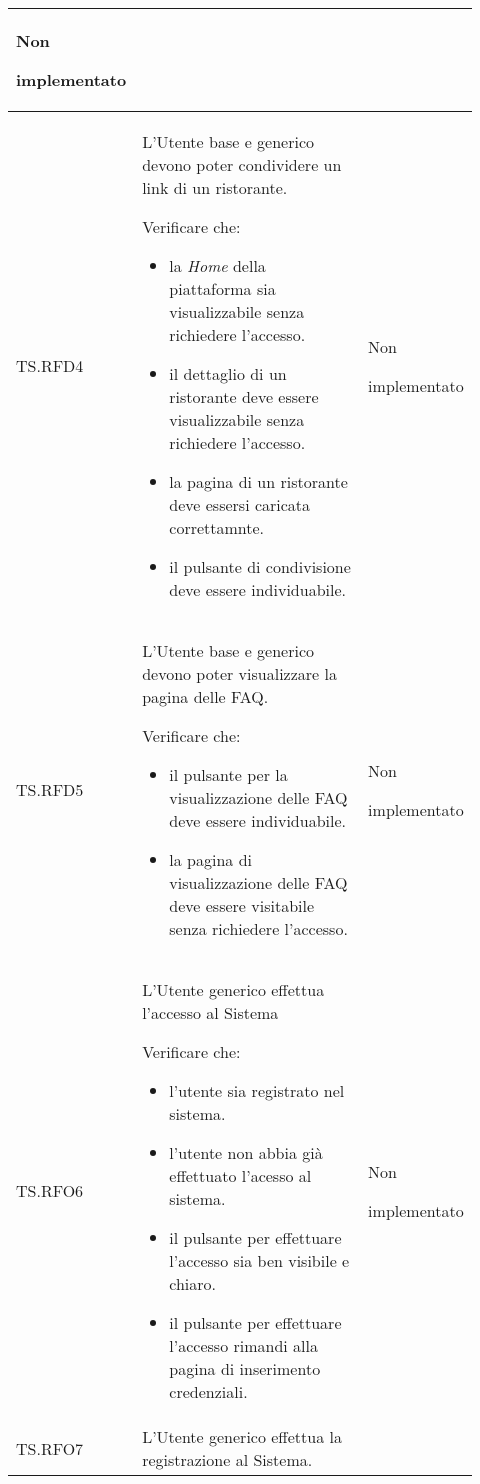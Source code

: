 \begin{longtable}{|p{0.10\linewidth}|p{0.70\linewidth}|p{0.12\linewidth}|}
    Non \par implementato  \\
    \hline
    TS.RFD4 & 
    L'Utente base e generico devono poter condividere un link di un ristorante. \par 
    Verificare che: 
    \begin{itemize}
        \item la \textit{Home} della piattaforma sia visualizzabile senza richiedere l'accesso.
        \item il dettaglio di un ristorante deve essere visualizzabile senza richiedere l'accesso.
        \item la pagina di un ristorante deve essersi caricata correttamnte.
        \item il pulsante di condivisione deve essere individuabile.
    \end{itemize}&
    Non \par implementato  \\
    \hline
    TS.RFD5 & 
    L'Utente base e generico devono poter visualizzare la pagina delle FAQ\g. \par 
    Verificare che: 
    \begin{itemize}
        \item il pulsante per la visualizzazione delle FAQ deve essere individuabile.
        \item la pagina di visualizzazione delle FAQ deve essere visitabile senza richiedere l'accesso.
    \end{itemize}&
    Non \par implementato  \\
    \hline
    TS.RFO6 & 
    L'Utente generico effettua l'accesso al Sistema \par 
    Verificare che: 
    \begin{itemize}
        \item l'utente sia registrato nel sistema.
        \item l'utente non abbia già effettuato l'acesso al sistema.
        \item il pulsante per effettuare l'accesso sia ben visibile e chiaro.
        \item il pulsante per effettuare l'accesso rimandi alla pagina di inserimento credenziali.
    \end{itemize}&
    Non \par implementato  \\
    \hline
    TS.RFO7 & 
    L'Utente generico effettua la registrazione al Sistema. \par 

\end{longtable}
